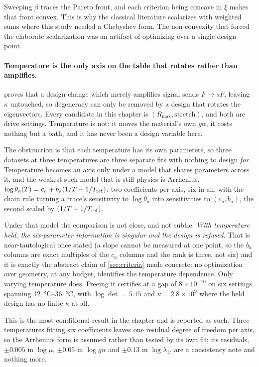 \documentclass[10pt]{article}
\begin{document}
Sweeping $\beta$ traces the Pareto front, and each criterion being concave in $\xi$ makes that
front convex. This is why the classical literature scalarizes with weighted sums where this
study needed a Chebyshev form. The non-convexity that forced the elaborate scalarization was
an artifact of optimizing over a single design point.

\paragraph{Temperature is the only axis on the table that rotates rather than amplifies.}
 proves that a design change which merely amplifies signal sends
$F \to sF$, leaving $\kappa$ untouched, so degeneracy can only be removed by a design that
rotates the eigenvectors. Every candidate in this chapter is $(R_{\max}, \text{stretch})$, and
both are drive settings. Temperature is not: it moves the material's own $g\alpha$, it costs
nothing but a bath, and it has never been a design variable here.

The obstruction is that each temperature has its own parameters, so three datasets at three
temperatures are three separate fits with nothing to design \emph{for}. Temperature becomes an
axis only under a model that shares parameters across it, and the weakest such model that is
still physics is Arrhenius, $\log\theta_a(T) = c_a + b_a(1/T - 1/T_{\rm ref})$: two coefficients
per axis, six in all, with the chain rule turning a trace's sensitivity to $\log\theta_a$ into
sensitivities to $(c_a, b_a)$, the second scaled by $(1/T - 1/T_{\rm ref})$.

Under that model the comparison is not close, and not subtle. \emph{With temperature held, the
six-parameter information is singular and the design is refused.} That is near-tautological once
stated (a slope cannot be measured at one point, so the $b_a$ columns are exact multiples of
the $c_a$ columns and the rank is three, not six) and it is exactly the abstract claim of
\cref{sec:criteria} made concrete: no optimization over geometry, at any budget, identifies the
temperature dependence. Only varying temperature does. Freeing it certifies at a gap of
$8\times10^{-10}$ on six settings spanning \SIrange{12}{36}{\celsius}, with $\log\det = 5.15$ and
$\kappa = 2.8\times10^{9}$ where the held design has no finite $\kappa$ at all.

This is the most conditional result in the chapter and is reported as such. Three temperatures
fitting six coefficients leaves one residual degree of freedom per axis, so the Arrhenius form is
assumed rather than tested by its own fit; its residuals, $\pm0.005$ in $\log\mu$, $\pm0.05$ in
$\log g\alpha$ and $\pm0.13$ in $\log\lambda_1$, are a consistency note and nothing more.
\end{document}
